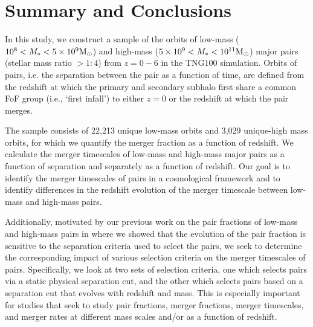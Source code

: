 \documentclass[twocolumn,linenumbers]{aastex631}
\begin{document}
\section{Summary and Conclusions}\label{sec:conclusions}
    In this study, we construct a sample of the orbits of low-mass ($10^8 <M_{*{}}<5\times10^{9}\mathrm{M}_\odot$) and high-mass ($5\times10^{9}<M_{*{}}<10^{11}\mathrm{M}_\odot$) major pairs (stellar mass ratio $> 1:4$) from $z=0-6$ in the TNG100 simulation.
    Orbits of pairs, i.e. the separation between the pair as a function of time, are defined from the redshift at which the primary and secondary subhalo first share a common FoF group (i.e., `first infall') to either $z=0$ or the redshift at which the pair merges.
    
    The sample consists of 22,213 unique low-mass orbits and 3,029 unique-high mass orbits, for which we quantify the merger fraction as a function of redshift.
    We calculate the merger timescales of low-mass and high-mass major pairs as a function of separation and separately as a function of redshift. 
    Our goal is to identify the merger timescales of pairs in a cosmological framework and to identify differences in the redshift evolution of the merger timescale between low-mass and high-mass pairs. 
    
    Additionally, motivated by our previous work on the pair fractions of low-mass and high-mass pairs in \citet{Chamberlain2024} where we showed that the evolution of the pair fraction is sensitive to the separation criteria used to select the pairs, we seek to determine the corresponding impact of various selection criteria on the merger timescales of pairs. 
    Specifically, we look at two sets of selection criteria, one which selects pairs via a static physical separation cut, and the other which selects pairs based on a separation cut that evolves with redshift and mass.
    This is especially important for studies that seek to study pair fractions, merger fractions, merger timescales, and merger rates at different mass scales and/or as a function of redshift. 
\end{document}
